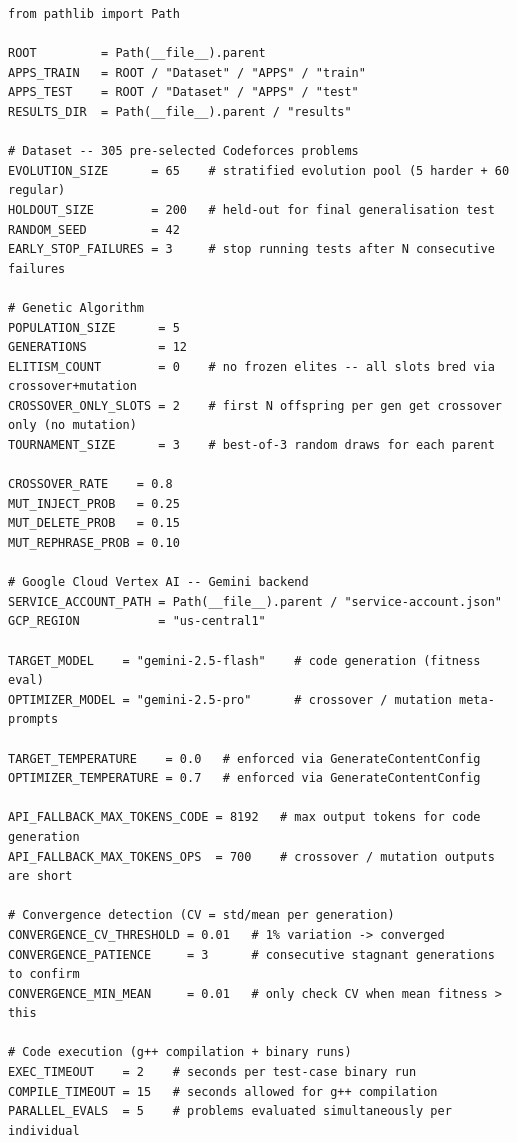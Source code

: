 \documentclass[11pt,a4paper]{report}
\begin{document}
\begin{lstlisting}[style=py, caption={config.py (complete)}]
from pathlib import Path

ROOT         = Path(__file__).parent
APPS_TRAIN   = ROOT / "Dataset" / "APPS" / "train"
APPS_TEST    = ROOT / "Dataset" / "APPS" / "test"
RESULTS_DIR  = Path(__file__).parent / "results"

# Dataset -- 305 pre-selected Codeforces problems
EVOLUTION_SIZE      = 65    # stratified evolution pool (5 harder + 60 regular)
HOLDOUT_SIZE        = 200   # held-out for final generalisation test
RANDOM_SEED         = 42
EARLY_STOP_FAILURES = 3     # stop running tests after N consecutive failures

# Genetic Algorithm
POPULATION_SIZE      = 5
GENERATIONS          = 12
ELITISM_COUNT        = 0    # no frozen elites -- all slots bred via crossover+mutation
CROSSOVER_ONLY_SLOTS = 2    # first N offspring per gen get crossover only (no mutation)
TOURNAMENT_SIZE      = 3    # best-of-3 random draws for each parent

CROSSOVER_RATE    = 0.8
MUT_INJECT_PROB   = 0.25
MUT_DELETE_PROB   = 0.15
MUT_REPHRASE_PROB = 0.10

# Google Cloud Vertex AI -- Gemini backend
SERVICE_ACCOUNT_PATH = Path(__file__).parent / "service-account.json"
GCP_REGION           = "us-central1"

TARGET_MODEL    = "gemini-2.5-flash"    # code generation (fitness eval)
OPTIMIZER_MODEL = "gemini-2.5-pro"      # crossover / mutation meta-prompts

TARGET_TEMPERATURE    = 0.0   # enforced via GenerateContentConfig
OPTIMIZER_TEMPERATURE = 0.7   # enforced via GenerateContentConfig

API_FALLBACK_MAX_TOKENS_CODE = 8192   # max output tokens for code generation
API_FALLBACK_MAX_TOKENS_OPS  = 700    # crossover / mutation outputs are short

# Convergence detection (CV = std/mean per generation)
CONVERGENCE_CV_THRESHOLD = 0.01   # 1% variation -> converged
CONVERGENCE_PATIENCE     = 3      # consecutive stagnant generations to confirm
CONVERGENCE_MIN_MEAN     = 0.01   # only check CV when mean fitness > this

# Code execution (g++ compilation + binary runs)
EXEC_TIMEOUT    = 2    # seconds per test-case binary run
COMPILE_TIMEOUT = 15   # seconds allowed for g++ compilation
PARALLEL_EVALS  = 5    # problems evaluated simultaneously per individual
\end{lstlisting}
\end{document}
